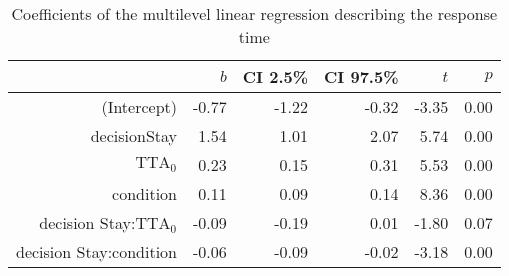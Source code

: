 \begin{table}[h]
\centering
\caption{Coefficients of the multilevel linear regression describing the response time}
\label{tab:RT}
\begin{tabular}{rrrrrr}
\toprule
 & $b$ & CI 2.5\% & CI 97.5\% & $t$ & $p$ \\
\midrule
(Intercept) & -0.77 & -1.22 & -0.32 & -3.35 & 0.00 \\
decisionStay & 1.54 & 1.01 & 2.07 & 5.74 & 0.00 \\
$\textrm{TTA}_0$ & 0.23 & 0.15 & 0.31 & 5.53 & 0.00 \\
condition & 0.11 & 0.09 & 0.14 & 8.36 & 0.00 \\
decision Stay:$\textrm{TTA}_0$ & -0.09 & -0.19 & 0.01 & -1.80 & 0.07 \\
decision Stay:condition & -0.06 & -0.09 & -0.02 & -3.18 & 0.00 \\
\bottomrule
\end{tabular}
\end{table}
